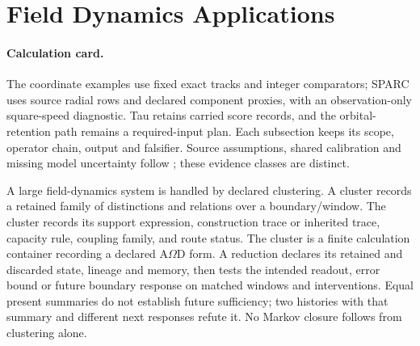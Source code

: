 
\clearpage
\section{Field Dynamics Applications}\label{manual:field-dynamics-applications}

\paragraph{Calculation card.}
The coordinate examples use fixed exact tracks and integer comparators;
SPARC uses source radial rows and declared component proxies, with an
observation-only square-speed diagnostic. Tau retains carried score records,
and the orbital-retention path remains a required-input plan. Each subsection
keeps its scope, operator chain, output and falsifier. Source assumptions,
shared calibration and missing model uncertainty follow
; these evidence classes are distinct.




A large field-dynamics system is handled by declared clustering. A cluster records a retained family of distinctions and relations over a boundary/window. The cluster records its support expression, construction trace or inherited trace, capacity rule, coupling family, and route status. The cluster is a finite calculation container recording a declared A\(\Omega\)D form.
A reduction declares its retained and discarded state, lineage and memory,
then tests the intended readout, error bound or future boundary response on
matched windows and interventions. Equal present summaries do not establish
future sufficiency; two histories with that summary and different next
responses refute it. No Markov closure follows from clustering alone.




